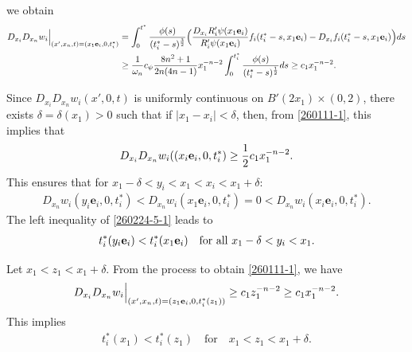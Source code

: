 \documentclass{amsart}
\numberwithin{equation}{section}
\newcommand{\om}{{ \omega  }}
\newcommand{\de}{\delta}
\begin{document}
we obtain 
\begin{align}\label{260111-1}
\begin{split}
D_{x_i} D_{x_n} w_i \Big|_{(x', x_n, t) = (x_1 {\bf e}_i, 0, t_i^*)} 
& = \int_0^{t^*} \frac{\phi(s)}{(t_i^* -s)^{\frac{3}{2}}} 
\Big( \frac{D_{x_i} R'_i \psi(x_1 {\bf e}_i)}{R'_i \psi (x_1 {\bf e}_i)} f_i (t_i^* -s, x_1 {\bf e}_i) 
- D_{x_i} f_i (t_i^* -s, x_1 {\bf e}_i) \Big) ds\\
&\geq  \frac1{\om_n}  c_\psi   \frac{8n^2 +1}{ 2n (4n-1)}   x_1^{-n-2} \int_0^{t_i^*} \frac{\phi(s)}{(t_i^* -s)^{\frac{1}{2}}} ds 
\geq c_1  x_1^{-n-2}.
\end{split}
\end{align}


 

 
 
 
Since  $ D_{x_i} D_{x_n} w_i (x', 0,t)$ is uniformly continuous on $B'(2x_1) \times (0,2)$, there exists $\de= \de(x_1)> 0$ such that  if   $ |x_1  -x_i| < \de $, then, from \eqref{260111-1}, this  implies  that
\begin{align*}
D_{x_i} D_{x_n} w_i  ((x_i{\bf e}_i, 0 , t_i^*) \geq  \frac12 c_1  x_1^{-n-2}.
\end{align*}
This ensures that for $x_1 - \delta < y_i < x_1 < x_i < x_1 + \delta$:
\begin{align}\label{260224-5-1}
D_{x_n} w_i (y_i \mathbf{e}_i, 0, t^*_i ) < D_{x_n} w_i (x_1 \mathbf{e}_i, 0, t_i^*) = 0 < D_{x_n} w_i (x_i \mathbf{e}_i, 0, t_i^*).
\end{align}
The left inequality of \eqref{260224-5-1} leads to  
\begin{align*}%
t_i^*(y_i {\bf e}_i) < t_i^*(x_1 {\bf e}_i)  \quad \text{for all } x_1 -\de < y_i < x_1.
\end{align*}

 
Let  $ x_1 < z_1< x_1 +\de $.  From the process to obtain   \eqref{260111-1}, we have 
\begin{align*}%
\begin{split}
D_{x_i} D_{x_n} w_i \Big|_{(x', x_n, t) = (z_1 {\bf e}_i, 0, t_i^*(z_1))}  \geq c_1  z_1^{-n-2} \geq c_1   x_1^{-n-2}.
\end{split}
\end{align*}
This implies 
\begin{align*}%
 t_i^*(x_1) <   t_i^* (z_1) \quad \mbox{for} \quad x_1 < z_1< x_1 +\de.
\end{align*}
 
\end{document}
